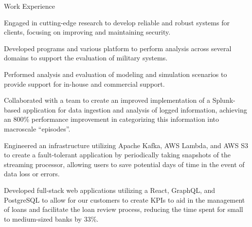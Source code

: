 \documentclass{resume} %
\begin{document}
\begin{workSection}{Work Experience}
    \experienceItem[
        company=Georgia Tech Research Institute (GTRI),
        location=Atlanta{,} GA,
        position=Graduate Research Assistant --- Clearance: Secret,
        duration=May 2024\textendash{Present}
    ]
    \begin{bullets}
        \item Engaged in cutting-edge research to develop reliable and robust systems for clients, focusing on improving and maintaining security.
        \item Developed programs and various platform to perform analysis across several domains to support the evaluation of military systems.
        \item Performed analysis and evaluation of modeling and simulation scenarios to provide support for in-house and commercial support.
    \end{bullets}
    
    \experienceItem[
        company=Splunk,
        location=San Jose{,} CA,
        position=Backend Software Engineer Intern,
        duration=May 2023\textendash{July 2023}
    ]
    \begin{bullets}
        \item Collaborated with a team to create an improved implementation of a Splunk-based application for data ingestion and analysis of logged information, achieving an 800\% performance improvement in categorizing this information into macroscale ``episodes''.
        \item Engineered an infrastructure utilizing Apache Kafka, AWS Lambda, and AWS S3 to create a fault-tolerant application by periodically taking snapshots of the streaming processor, allowing users to save potential days of time in the event of data loss or errors.
    \end{bullets}
     
    \experienceItem[
        company=QwickRate,
        location=Marietta{,} GA,
        position=Software Engineer Intern,
        duration=August 2022\textendash{April 2023}
    ]
    \begin{bullets}
        \item Developed full-stack web applications utilizing a React, GraphQL, and PostgreSQL to allow for our customers to create KPIs to aid in the management of loans and facilitate the loan review process, reducing the time spent for small to medium-sized banks by 33\%.
    \end{bullets}


\end{workSection}
\end{document}
